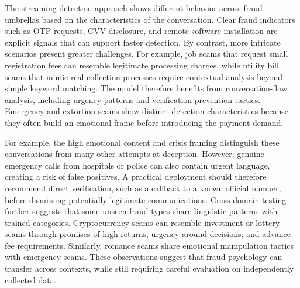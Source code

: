 \documentclass{article}
\begin{document}
The streaming detection approach shows different behavior across fraud umbrellas based on the characteristics of the conversation. Clear fraud indicators such as OTP requests, CVV disclosure, and remote software installation are explicit signals that can support faster detection. By contrast, more intricate scenarios present greater challenges. For example, job scams that request small registration fees can resemble legitimate processing charges, while utility bill scams that mimic real collection processes require contextual analysis beyond simple keyword matching. The model therefore benefits from conversation-flow analysis, including urgency patterns and verification-prevention tactics. Emergency and extortion scams show distinct detection characteristics because they often build an emotional frame before introducing the payment demand.

For example, the high emotional content and crisis framing distinguish these conversations from many other attempts at deception. However, genuine emergency calls from hospitals or police can also contain urgent language, creating a risk of false positives. A practical deployment should therefore recommend direct verification, such as a callback to a known official number, before dismissing potentially legitimate communications. Cross-domain testing further suggests that some unseen fraud types share linguistic patterns with trained categories. Cryptocurrency scams can resemble investment or lottery scams through promises of high returns, urgency around decisions, and advance-fee requirements. Similarly, romance scams share emotional manipulation tactics with emergency scams. These observations suggest that fraud psychology can transfer across contexts, while still requiring careful evaluation on independently collected data.







\end{document}
